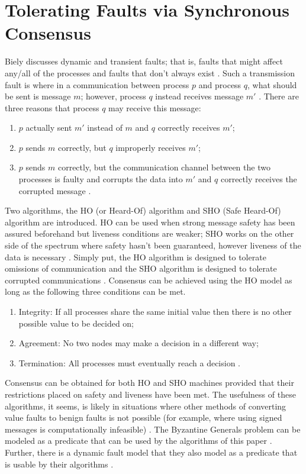 \documentclass[twoside, conference]{IEEEtran}%
\begin{document}
\section{Tolerating Faults via Synchronous Consensus}\label{sec:toleratingfaults}
Biely discusses dynamic and transient faults; that is, faults that might affect any/all of the processes and faults that don't always exist \cite{Biely2007}.  Such a transmission fault is where in a communication between process $p$ and process $q$, what should be sent is message $m$; however, process $q$ instead receives message $m'$ \cite{Biely2007}.  There are three reasons that process $q$ may receive this message:
\begin{enumerate}
	\item $p$ actually sent $m'$ instead of $m$ and $q$ correctly receives $m'$;
	\item $p$ sends $m$ correctly, but $q$ improperly receives $m'$;
	\item $p$ sends $m$ correctly, but the communication channel between the two processes is faulty and corrupts the data into $m'$ and $q$ correctly receives the corrupted message \cite{Biely2007}.
\end{enumerate}
Two algorithms, the HO (or Heard-Of) algorithm and SHO (Safe Heard-Of) algorithm are introduced.  HO can be used when strong message safety has been assured beforehand but liveness conditions are weaker; SHO works on the other side of the spectrum where safety hasn't been guaranteed, however liveness of the data is necessary \cite{Biely2007}.  Simply put, the HO algorithm is designed to tolerate omissions of communication and the SHO algorithm is designed to tolerate corrupted communications \cite{Biely2007}.
Consensus can be achieved using the HO model as long as the following three conditions can be met.
\begin{enumerate}
	\item Integrity: If all processes share the same initial value then there is no other possible value to be decided on;
	\item Agreement: No two nodes may make a decision in a different way;
	\item Termination: All processes must eventually reach a decision \cite{Biely2007}.
\end{enumerate}
Consensus can be obtained for both HO and SHO machines provided that their restrictions placed on safety and liveness have been met.  The usefulness of these algorithms, it seems, is likely in situations where other methods of converting value faults to benign faults is not possible (for example, where using signed messages is computationally infeasible) \cite{Biely2007}.  The Byzantine Generals problem can be modeled as a predicate that can be used by the algorithms of this paper \cite{Biely2007}.  Further, there is a dynamic fault model that they also model as a predicate that is usable by their algorithms \cite{Biely2007}.
\end{document}
